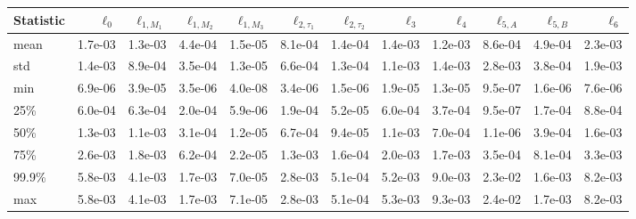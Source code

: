 \begin{tabular}{lrrrrrrrrrrr}
\toprule
Statistic & $\ell_0$ & $\ell_{1,M_1}$ & $\ell_{1,M_2}$ & $\ell_{1,M_3}$ & $\ell_{2,\tau_1}$ & $\ell_{2,\tau_2}$ & $\ell_3$ & $\ell_4$ & $\ell_{5,A}$ & $\ell_{5,B}$ & $\ell_6$ \\
\midrule
mean & 1.7e-03 & 1.3e-03 & 4.4e-04 & 1.5e-05 & 8.1e-04 & 1.4e-04 & 1.4e-03 & 1.2e-03 & 8.6e-04 & 4.9e-04 & 2.3e-03 \\
std & 1.4e-03 & 8.9e-04 & 3.5e-04 & 1.3e-05 & 6.6e-04 & 1.3e-04 & 1.1e-03 & 1.4e-03 & 2.8e-03 & 3.8e-04 & 1.9e-03 \\
min & 6.9e-06 & 3.9e-05 & 3.5e-06 & 4.0e-08 & 3.4e-06 & 1.5e-06 & 1.9e-05 & 1.3e-05 & 9.5e-07 & 1.6e-06 & 7.6e-06 \\
25\% & 6.0e-04 & 6.3e-04 & 2.0e-04 & 5.9e-06 & 1.9e-04 & 5.2e-05 & 6.0e-04 & 3.7e-04 & 9.5e-07 & 1.7e-04 & 8.8e-04 \\
50\% & 1.3e-03 & 1.1e-03 & 3.1e-04 & 1.2e-05 & 6.7e-04 & 9.4e-05 & 1.1e-03 & 7.0e-04 & 1.1e-06 & 3.9e-04 & 1.6e-03 \\
75\% & 2.6e-03 & 1.8e-03 & 6.2e-04 & 2.2e-05 & 1.3e-03 & 1.6e-04 & 2.0e-03 & 1.7e-03 & 3.5e-04 & 8.1e-04 & 3.3e-03 \\
99.9\% & 5.8e-03 & 4.1e-03 & 1.7e-03 & 7.0e-05 & 2.8e-03 & 5.1e-04 & 5.2e-03 & 9.0e-03 & 2.3e-02 & 1.6e-03 & 8.2e-03 \\
max & 5.8e-03 & 4.1e-03 & 1.7e-03 & 7.1e-05 & 2.8e-03 & 5.1e-04 & 5.3e-03 & 9.3e-03 & 2.4e-02 & 1.7e-03 & 8.2e-03 \\
\bottomrule
\end{tabular}
